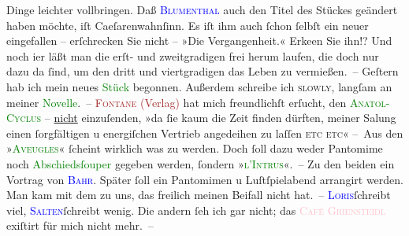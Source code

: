                     Dinge leichter vollbringen. Daß \textcolor{blue}{\textsc{Blumenthal}}{}\ledrightnote{\textcolor{blue}{Oskar Blumenthal}} auch den Titel des Stückes geändert haben möchte, iſt
                    Caeſarenwahnſinn. Es iſt ihm auch ſchon ſelbſt ein neuer eingefallen – er{\pb}ſchrecken Sie nicht – »Die Vergangenheit.« Erke{\geminationn}en Sie
                    ihn!? Und noch i{\geminationm}er läßt man die erſt- und
                    zweitgradigen frei herum laufen, die doch nur dazu da ſind, um den dritt und
                    viertgradigen das Leben zu vermießen. –\pend
           \pstart
           Geſtern hab ich mein neues \textcolor{green}{Stück}{} begonnen.
                    Außerdem schreibe ich \textsc{slowly}, langſam an meiner \textcolor{green}{Novelle}{}. –\pend
           \pstart
           \textcolor{brown}{\textsc{Fontane} (Verlag)}{}\ledrightnote{\textcolor{brown}{F. Fontane}} hat mich freundlichſt
                    erſucht, den \textcolor{green}{\textsc{Anatol-Cyclus}}{}\ledrightnote{\textcolor{green}{Anatol}} – \uline{nicht} einzuſenden, {\pb}»da ſie kaum die Zeit finden dürften, meiner Sa{\geminationm}lung einen ſorgfältigen u energiſchen Vertrieb
                    angedeihen zu laſſen \textsc{etc etc}«\pend
           \pstart
           – Aus den »\textsc{\textcolor{green}{Aveugles}{}\ledrightnote{\textcolor{green}{Die Blinden}}}« ſcheint wirklich was zu werden. Doch ſoll dazu weder Pantomime noch
                        \textcolor{green}{Abschiedsſouper}{}\ledrightnote{\textcolor{green}{Abschiedssouper}} gegeben werden, ſondern
                        »\textsc{\textcolor{green}{l’Intrus}{}\ledrightnote{\textcolor{green}{L’Intruse}}}«. – Zu den beiden ein Vortrag von \textcolor{blue}{\textsc{Bahr}}{}\ledrightnote{\textcolor{blue}{Hermann Bahr}}. Später ſoll ein Pantomimen u Luſtſpielabend arrangirt werden. Man
                    kam mit dem \label{K_L00079_2v}\label{K_L00079_2h} zu uns, das {\pb}freilich meinen Beifall nicht hat. –\pend
           \pstart
           \textcolor{blue}{\textsc{Loris}}{}\ledrightnote{\textcolor{blue}{Hugo von Hofmannsthal}}{ }ſchreibt viel, \textcolor{blue}{\textsc{Salten}}{}\ledrightnote{\textcolor{blue}{Felix Salten}}{ }ſchreibt wenig. Die andern ſeh ich gar nicht; das \textcolor{pink}{\textsc{Café Griensteidl}}{}\ledrightnote{\textcolor{pink}{Café Griensteidl}} exiſtirt für mich nicht mehr. – \pend
